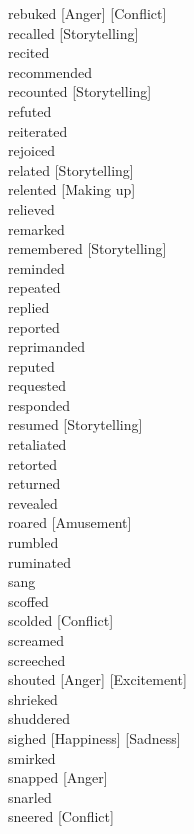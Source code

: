 rebuked [Anger] [Conflict] \hfill \\
recalled [Storytelling] \hfill \\
recited \hfill \\
recommended \hfill \\
recounted [Storytelling] \hfill \\
refuted \hfill \\
reiterated \hfill \\
rejoiced \hfill \\
related [Storytelling] \hfill \\
relented [Making up] \hfill \\
relieved \hfill \\
remarked \hfill \\
remembered [Storytelling] \hfill \\
reminded \hfill \\
repeated \hfill \\
replied \hfill \\
reported \hfill \\
reprimanded \hfill \\
reputed \hfill \\
requested \hfill \\
responded \hfill \\
resumed [Storytelling] \hfill \\
retaliated \hfill \\
retorted \hfill \\
returned \hfill \\
revealed \hfill \\
roared [Amusement] \hfill \\
rumbled \hfill \\
ruminated \hfill \\
sang \hfill \\
scoffed \hfill \\
scolded [Conflict] \hfill \\
screamed \hfill \\
screeched \hfill \\
shouted [Anger] [Excitement] \hfill \\
shrieked \hfill \\
shuddered \hfill \\
sighed [Happiness] [Sadness] \hfill \\
smirked \hfill \\
snapped [Anger] \hfill \\
snarled \hfill \\
sneered [Conflict] \hfill \\
